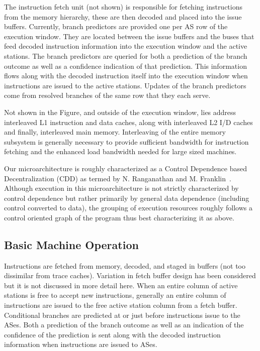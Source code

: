 \documentclass[10pt,dvips]{article}
\begin{document}
The instruction fetch unit (not shown) is responsible for
fetching instructions from the memory hierarchy, these are then decoded
and placed into the issue buffers.   
Currently, branch predictors are provided one per AS row of the execution
window.  
They are located between the issue buffers and the buses that feed
decoded instruction information into the execution window and the
active stations.  The branch predictors are queried for both
a prediction of the branch outcome as well as a confidence
indication of that prediction.  This information flows along with
the decoded instruction itself into the
execution window when instructions are issued to the active stations.
Updates of the branch predictors come from resolved branches
of the same row that they each serve.

Not shown in the Figure, and outside of the execution window,
lies address interleaved L1 instruction and data caches, along with
interleaved L2 I/D caches and finally, interleaved main memory.
Interleaving of the entire memory subsystem is generally necessary
to provide sufficient bandwidth for instruction fetching and the
enhanced load bandwidth needed for large sized machines.

Our microarchitecture is roughly characterized as a Control Dependence
based Decentralization (CDD) as termed by N. Ranganathan and
M. Franklin~\cite{Ranganathan98}.
Although execution in this microarchitecture is not strictly
characterized by control dependence but rather primarily by
general data dependence (including control converted to data),
the grouping of execution resources roughly follows a control
oriented graph of the program thus best characterizing it as above.
%
\subsection{Basic Machine Operation}
%
Instructions are fetched from memory, decoded, and staged in buffers
(not too dissimilar from trace caches).  Variation in fetch buffer
design has been considered but it is not discussed in more detail here.
When an entire column
of active stations is free to accept new instructions, generally
an entire column of instructions are issued to the free active station
column from a fetch buffer.
Conditional branches are
predicted at or just before instructions issue to the ASes.
Both a prediction of the branch outcome as well as an indication
of the confidence of the prediction is sent along with the
decoded instruction information when instructions are issued to
ASes.
\end{document}
